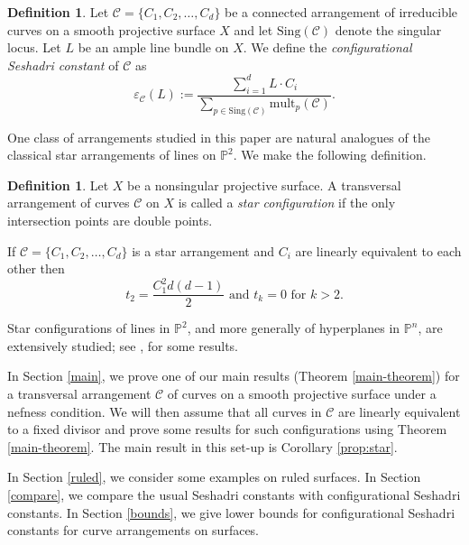 \documentclass[12pt,reqno]{amsart}
\theoremstyle{plain}
\numberwithin{equation}{section}
\theoremstyle{definition}
\newtheorem{definition}[theorem]{Definition}
\begin{document}
	\begin{definition}
		Let $\mathcal{C}=\{C_1,C_2, \ldots ,C_d\}$ be a connected arrangement of irreducible curves
		on a smooth projective surface $X$ and let $\text{Sing}(\mathcal{C})$ denote the singular locus.  Let $L$ be an ample line bundle on $X$. We define the \textit{configurational Seshadri constant} of $\mathcal{C}$ as 
			$$\varepsilon_\mathcal{C}(L):= \frac{\sum\limits_{i=1}^{d}L\cdot C_i}{\sum\limits_{p \in \text{Sing}(\mathcal{C}) }\text{mult}_p(\mathcal{C})}.$$
	\end{definition}	
	

One class of arrangements studied in this paper are 
 natural analogues of the classical star arrangements of lines on $\mathbb{P}^2$. 
We make the following definition. 

\begin{definition} Let $X$ be a nonsingular projective surface.  
A transversal arrangement of curves $\mathcal{C}$ on $X$
		 is called a \emph{star  configuration} if the only intersection points are double points.
	\end{definition}
	
If $\mathcal{C}= \{C_1,C_2, \ldots ,C_d\}$ is a star arrangement and $C_i$ are linearly equivalent to each other then $$t_2=\frac{C_1^2d(d-1)}{2}\text{ and }t_k = 0 \text{ for } k > 2.$$ 

Star configurations of lines in $\mathbb{P}^2$, and more generally of hyperplanes in $\mathbb{P}^n$, are extensively studied; 
see \cite{CV,GHM, JP}, for some results. 	
	
In Section \ref{main}, we prove one of our main results (Theorem \ref{main-theorem})
for a transversal arrangement $\mathcal{C}$ of curves on a smooth projective surface under a nefness condition. We will then assume that all curves in $\mathcal{C}$ are linearly equivalent to a fixed divisor and prove some results for such configurations using Theorem \ref{main-theorem}. The main result in this set-up is Corollary \ref{prop:star}.  

In Section \ref{ruled}, we consider some examples on ruled surfaces. In Section \ref{compare}, we compare the usual Seshadri constants with configurational Seshadri constants. In Section \ref{bounds}, we give lower bounds for configurational Seshadri constants for curve arrangements on surfaces. 
\end{document}
